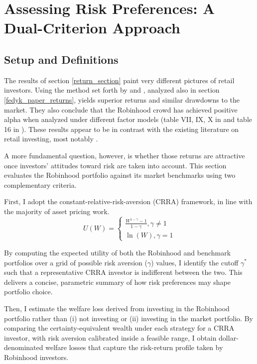 \section{Assessing Risk Preferences: A Dual-Criterion Approach}
\subsection{Setup and Definitions}
The results of section \ref{return_section} paint very different pictures of retail investors. 
Using the method set forth by \cite{Welch2022} and \cite{Fedyk2024}, analyzed also in section \ref{fedyk_paper_returns}, yields superior returns and similar drawdowns to the market.
They also conclude that the Robinhood crowd has achieved positive alpha when analyzed under different factor models (table VII, IX, X in \cite{Welch2022} and table 16 in \cite{Fedyk2024}). 
These results appear to be in contrast with the existing literature on retail investing, most notably \cite{BarberOdean2000}.

A more fundamental question, however, is whether those returns are attractive once investors' attitudes toward risk are taken into account.
This section evaluates the Robinhood portfolio against its market benchmarks using two complementary criteria.

First, I adopt the constant-relative-risk-aversion (CRRA) framework, in line with the majority of asset pricing work.
\begin{equation}
    U(W) = 
    \begin{cases}
    \frac{W^{1-\gamma}-1}{1-\gamma}, \gamma\neq 1\\
    \ln(W), \gamma = 1
    \end{cases}
    \label{CRRA}
\end{equation}

By computing the expected utility of both the Robinhood and benchmark portfolios over a grid of possible risk aversion ($\gamma$) values,
I identify the cutoff $\gamma^*$ such that a representative CRRA investor is indifferent between the two.
This delivers a concise, parametric summary of how risk preferences may shape portfolio choice.

Then, I estimate the welfare loss derived from investing in the Robinhood portfolio rather than (i)  not investing or (ii) investing in the market portfolio.
By comparing the certainty-equivalent wealth under each strategy for a CRRA investor, with risk aversion calibrated inside a feasible range,
I obtain dollar-denominated welfare losses that capture the risk-return profile taken by Robinhood investors.

